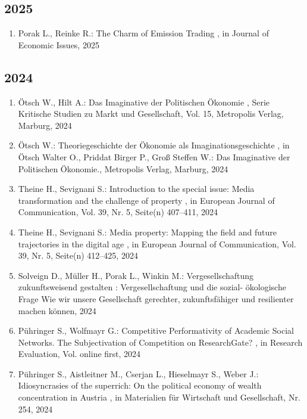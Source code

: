 \begin{enumerate}[leftmargin=*, labelsep=0.5cm]
\end{enumerate} 
 \subsection*{2025} 
 \begin{enumerate}[leftmargin=*, labelsep=0.5cm] 
	 \item Porak L., Reinke R.:  The Charm of Emission Trading  , in Journal of Economic Issues, 2025
\end{enumerate} 
 \subsection*{2024} 
 \begin{enumerate}[leftmargin=*, labelsep=0.5cm] 
	 \item Ötsch W., Hilt A.:  Das Imaginative der Politischen Ökonomie  , Serie Kritische Studien zu Markt und Gesellschaft, Vol. 15, Metropolis Verlag, Marburg, 2024
	 \item Ötsch W.:  Theoriegeschichte der Ökonomie als Imaginationsgeschichte  , in Ötsch Walter O., Priddat Birger P., Groß Steffen W.: Das Imaginative der Politischen Ökonomie., Metropolis Verlag, Marburg, 2024
	 \item Theine H., Sevignani S.:  Introduction to the special issue: Media transformation and the challenge of property  , in European Journal of Communication, Vol. 39, Nr. 5, Seite(n) 407–411, 2024
	 \item Theine H., Sevignani S.:  Media property: Mapping the field and future trajectories in the digital age  , in European Journal of Communication, Vol. 39, Nr. 5, Seite(n) 412–425, 2024
	 \item Solveign D., Müller H., Porak L., Winkin M.:  Vergesellschaftung zukunftsweisend gestalten  : Vergesellschaftung und die sozial- ökologische Frage Wie wir unsere Gesellschaft gerechter, zukunftsfähiger und resilienter machen können, 2024
	 \item Pühringer S., Wolfmayr G.:  Competitive Performativity of Academic Social Networks. The Subjectivation of Competition on ResearchGate?  , in Research Evaluation, Vol. online first, 2024
	 \item Pühringer S., Aistleitner M., Cserjan L., Hieselmayr S., Weber J.:  Idiosyncrasies of the superrich: On the political economy of wealth concentration in Austria  , in Materialien für Wirtschaft und Gesellschaft, Nr. 254, 2024

\end{enumerate}
